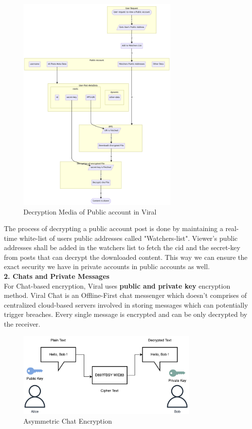 \documentclass[10pt]{article}
\begin{document}
\begin{figure}[H]
\begin{center}
\includegraphics[width=8cm]{decryption-public}
\caption{Decryption Media of Public account in Viral}
\end{center}
\end{figure}

The process of decrypting a public account post is done by maintaining a real-time white-list of users public addresses called "Watchers-list". Viewer's public addresses shall be added in the watchers list to fetch the cid and the secret-key from posts that can decrypt the downloaded content. This way we can ensure the exact security we have in private accounts in public accounts as well.\\


\textbf{2. Chats and Private Messages}\\

For Chat-based encryption, Viral uses \textbf{public and private key} encryption method. Viral Chat is an Offline-First chat messenger which doesn't comprises of centralized cloud-based servers involved in storing messages which can potentially trigger breaches. Every single message is encrypted and can be only decrypted by the receiver.\\

\begin{figure}[H]
\begin{center}
\includegraphics[width=9cm]{chat}
\caption{Asymmetric Chat Encryption}
\end{center}
\end{figure}
\end{document}
